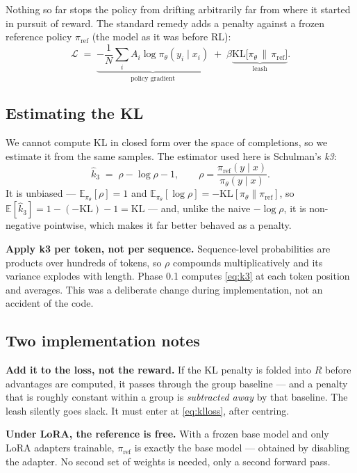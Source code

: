 \documentclass[11pt,letterpaper]{article}
\theoremstyle{definition}
\newcommand{\E}{\mathbb{E}}
\newcommand{\KL}{\mathrm{KL}}
\newcommand{\pol}{\pi_\theta}
\newcommand{\polref}{\pi_{\mathrm{ref}}}
\newcommand{\Adv}{A}
\begin{document}
Nothing so far stops the policy from drifting arbitrarily far from where it started in pursuit of
reward. The standard remedy adds a penalty against a frozen reference policy $\polref$ (the model as
it was before RL):
\begin{equation}
  \mathcal{L} \;=\; \underbrace{-\frac{1}{N}\sum_i \Adv_i \log \pol(y_i \mid x_i)}_{\text{policy gradient}}
  \;+\; \beta \underbrace{\KL\big[\pol \,\|\, \polref\big]}_{\text{leash}}.
  \label{eq:klloss}
\end{equation}

\subsection{Estimating the KL}

We cannot compute $\KL$ in closed form over the space of completions, so we estimate it from the same
samples. The estimator used here is Schulman's \emph{k3}:
\begin{equation}
  \hat{k}_3 \;=\; \rho - \log \rho - 1, \qquad \rho = \frac{\polref(y \mid x)}{\pol(y \mid x)} .
  \label{eq:k3}
\end{equation}
It is unbiased --- $\E_{\pol}[\rho] = 1$ and $\E_{\pol}[\log \rho] = -\KL[\pol \| \polref]$, so
$\E[\hat{k}_3] = 1 - (-\KL) - 1 = \KL$ --- and, unlike the naive $-\log\rho$, it is non-negative
pointwise, which makes it far better behaved as a penalty.

\begin{aside}
\textbf{Apply k3 per token, not per sequence.} Sequence-level probabilities are products over
hundreds of tokens, so $\rho$ compounds multiplicatively and its variance explodes with length.
Phase 0.1 computes \eqref{eq:k3} at each token position and averages. This was a deliberate change
during implementation, not an accident of the code.
\end{aside}

\subsection{Two implementation notes}

\textbf{Add it to the loss, not the reward.} If the KL penalty is folded into $R$ before advantages
are computed, it passes through the group baseline --- and a penalty that is roughly constant within
a group is \emph{subtracted away} by that baseline. The leash silently goes slack. It must enter at
\eqref{eq:klloss}, after centring.

\textbf{Under LoRA, the reference is free.} With a frozen base model and only LoRA adapters trainable,
$\polref$ is exactly the base model --- obtained by disabling the adapter. No second set of weights
is needed, only a second forward pass.
\end{document}
